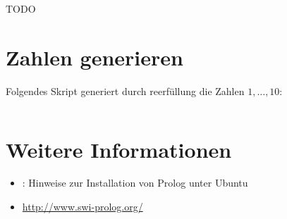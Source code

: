 TODO

\section{Zahlen generieren}
Folgendes Skript generiert durch reerfüllung die Zahlen $1, \dots, 10$:

\inputminted[numbersep=5pt, tabsize=4]{prolog}{scripts/prolog/zahlen-bis-10.pl}

\section{Weitere Informationen}
\begin{itemize}
    \item \href{http://wiki.ubuntuusers.de/Prolog}{}: Hinweise zur Installation von Prolog unter Ubuntu
    \item \url{http://www.swi-prolog.org/}
\end{itemize}
